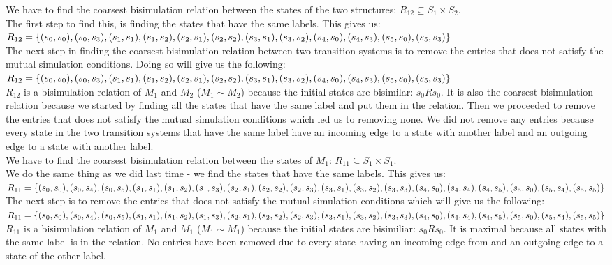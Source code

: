 \documentclass[12pt]{report}
\begin{document}
We have to find the coarsest bisimulation relation between the states of the two structures: $R_{12} \subseteq S_1 \times S_2$.\\
The first step to find this, is finding the states that have the same labels. This gives us:\\
$R_{12} = \{(s_0, s_0), (s_0, s_3), (s_1,s_1), (s_1,s_2),(s_2,s_1),(s_2,s_2),(s_3,s_1),(s_3,s_2),\\
(s_4,s_0),(s_4,s_3),(s_5,s_0),(s_5,s_3)\}$\\
The next step in finding the coarsest bisimulation relation between two transition systems is to remove the entries that does not satisfy the mutual simulation conditions. Doing so will give us the following:\\
$R_{12} = \{(s_0, s_0), (s_0, s_3), (s_1,s_1), (s_1,s_2),(s_2,s_1),(s_2,s_2),(s_3,s_1),(s_3,s_2),\\
(s_4,s_0),(s_4,s_3),(s_5,s_0),(s_5,s_3)\}$\\
$R_{12}$ is a bisimulation relation of $M_1$ and $M_2$ ($M_1 \sim M_2$) because the initial states are bisimilar: $s_0 R s_0$. It is also the coarsest bisimulation relation because we started by finding all the states that have the same label and put them in the relation. Then we proceeded to remove the entries that does not satisfy the mutual simulation conditions which led us to removing none. We did not remove any entries because every state in the two transition systems that have the same label have an incoming edge to a state with another label and an outgoing edge to a state with another label.\\
We have to find the coarsest bisimulation relation between the states of $M_1$: $R_{11} \subseteq S_1 \times S_1$.\\
We do the same thing as we did last time - we find the states that have the same labels. This gives us:\\
$R_{11} = \{(s_0,s_0),(s_0,s_4),(s_0,s_5),(s_1,s_1),(s_1,s_2),(s_1,s_3),(s_2,s_1),(s_2,s_2),\\
(s_2,s_3),(s_3,s_1),(s_3,s_2),(s_3,s_3),(s_4,s_0),(s_4,s_4),(s_4,s_5),(s_5,s_0),(s_5,s_4),\\(s_5,s_5)\}$\\
The next step is to remove the entries that does not satisfy the mutual simulation conditions which will give us the following:\\
$R_{11} = \{(s_0,s_0),(s_0,s_4),(s_0,s_5),(s_1,s_1),(s_1,s_2),(s_1,s_3),(s_2,s_1),(s_2,s_2),\\
(s_2,s_3),(s_3,s_1),(s_3,s_2),(s_3,s_3),(s_4,s_0),(s_4,s_4),(s_4,s_5),(s_5,s_0),(s_5,s_4),\\(s_5,s_5)\}$\\
$R_{11}$ is a bisimulation relation of $M_1$ and $M_1$ ($M_1 \sim M_1$) because the initial states are bisimiliar: $s_0 R s_0$. It is maximal because all states with the same label is in the relation. No entries have been removed due to every state having an incoming edge from and an outgoing edge to a state of the other label.\\
\end{document}
